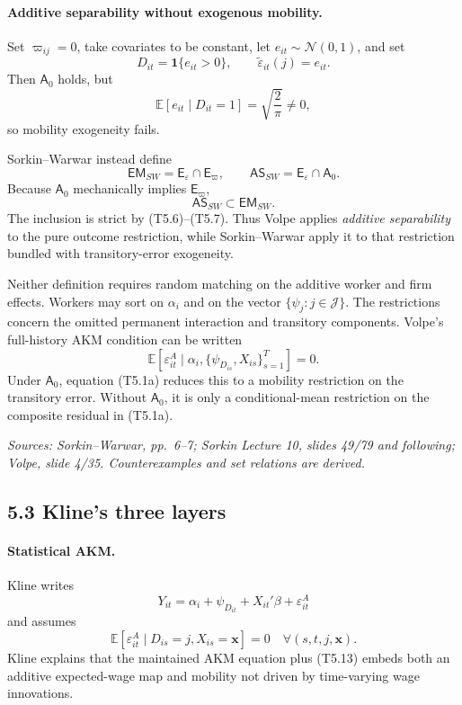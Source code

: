 \documentclass[11pt]{article}
\begin{document}
\paragraph{Additive separability without exogenous mobility.}
Set \(\varpi_{ij}=0\), take covariates to be constant, let
\(e_{it}\sim\mathcal N(0,1)\), and set
\[
D_{it}=\mathbf{1}\{e_{it}>0\},
\qquad
\widetilde\varepsilon_{it}(j)=e_{it}.
\tag{T5.8}
\]
Then \(\mathsf A_0\) holds, but
\[
\mathbb E[e_{it}\mid D_{it}=1]
=
\sqrt{\frac{2}{\pi}}\neq0,
\tag{T5.9}
\]
so mobility exogeneity fails.

Sorkin--Warwar instead define
\[
\mathsf{EM}_{SW}
=
\mathsf E_\varepsilon\cap\mathsf E_\varpi,
\qquad
\mathsf{AS}_{SW}
=
\mathsf E_\varepsilon\cap\mathsf A_0.
\tag{T5.10}
\]
Because \(\mathsf A_0\) mechanically implies
\(\mathsf E_\varpi\),
\[
\boxed{\mathsf{AS}_{SW}\subset\mathsf{EM}_{SW}.}
\tag{T5.11}
\]
The inclusion is strict by (T5.6)--(T5.7).  Thus Volpe applies
\emph{additive separability} to the pure outcome restriction, while
Sorkin--Warwar apply it
to that restriction bundled with transitory-error exogeneity.

Neither definition requires random matching on the additive worker and firm
effects.  Workers may sort on \(\alpha_i\) and on the vector
\(\{\psi_j:j\in\mathcal J\}\).  The restrictions concern the omitted permanent
interaction and transitory components.  Volpe's full-history AKM condition
can be written
\[
\mathbb E[
\varepsilon_{it}^A
\mid
\alpha_i,\{\psi_{D_{is}},X_{is}\}_{s=1}^T]=0.
\tag{T5.11a}
\]
Under \(\mathsf A_0\), equation (T5.1a) reduces this to a mobility restriction
on the transitory error.  Without \(\mathsf A_0\), it is only a
conditional-mean restriction on the composite residual in (T5.1a).

\textit{Sources: Sorkin--Warwar, pp.\ 6--7; Sorkin Lecture 10,
slides 49/79 and following; Volpe, slide 4/35.  Counterexamples and set
relations are derived.}

\subsection{5.3 Kline's three layers}

\paragraph{Statistical AKM.}
Kline writes
\[
Y_{it}
=
\alpha_i+\psi_{D_{it}}+X_{it}'\beta+\varepsilon^A_{it}
\tag{T5.12}
\]
and assumes
\[
\mathbb E[
\varepsilon^A_{it}
\mid D_{is}=j,X_{is}=\mathbf x]=0
\quad\forall(s,t,j,\mathbf x).
\tag{T5.13}
\]
Kline explains that the maintained AKM equation plus (T5.13) embeds both an
additive expected-wage map and mobility not driven by time-varying wage
innovations.
\end{document}
